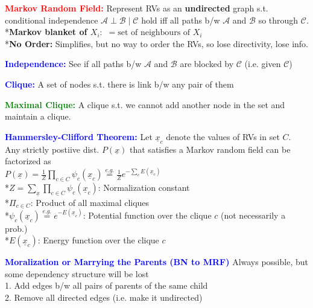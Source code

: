 \documentclass[5pt]{extarticle} %
\begin{document}
\begin{paracol}{3}
{    \textcolor{red}{\textbf{Markov Random Field:}} Represent RVs as an \textbf{undirected} graph s.t. conditional independence $\mathcal{A} \perp \mathcal{B} \mid \mathcal{C}$ hold iff all paths b/w $\mathcal{A}$ and $\mathcal{B}$ so through $\mathcal{C}$. \\
    *\textbf{Markov blanket of $X_i:$} $= \text{set of neighbours of } X_i$ \\
    *\textbf{No Order:} Simplifies, but no way to order the RVs, so lose directivity, lose info.

    \textcolor{blue}{\textbf{Independence:}} See if all paths b/w $\mathcal{A}$ and $\mathcal{B}$ are blocked by $\mathcal{C}$ (i.e. given $\mathcal{C}$) 

    \textcolor{blue}{\textbf{Clique:}} A set of nodes s.t. there is link b/w any pair of them

    \textcolor{green}{\textbf{Maximal Clique:}} A clique s.t. we cannot add another node in the set and maintain a clique. 

    \textcolor{blue}{\textbf{Hammersley-Clifford Theorem:}} Let $\underline{x}_c$ denote the values of RVs in set $C$. Any strictly postiive dist. $P(\underline{x})$ that satisfies a Markov random field can be factorized as \\
    $P(\underline{x}) = \frac{1}{Z} \prod_{c \in C} \psi_c(\underline{x}_c) \overset{e.g.}{=} \frac{1}{Z} e^{-\sum_c E(\underline{x}_c)}$ \\
    *$Z= \sum_{\underline{x}} \prod_{c \in C} \psi_c (\underline{x}_c)$: Normalization constant \\
    *$\Pi_{c \in C}$: Product of all maximal cliques \\
    *$\psi_c(\underline{x}_c) \overset{e.g.}{=} e^{-E(\underline{x}_c)}$: Potential function over the clique $c$ (not necessarily a prob.) \\
    *$E(\underline{x}_c)$: Energy function over the clique $c$ 

    \textcolor{blue}{\textbf{Moralization or Marrying the Parents (BN to MRF)}} Always possible, but some dependency structure will be lost \\
    1. Add edges b/w all pairs of parents of the same child \\ 
    2. Remove all directed edges (i.e. make it undirected) 

}
\end{paracol}
\end{document}
